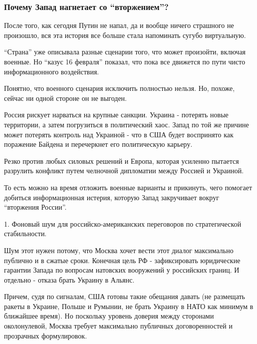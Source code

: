  
 
 
 
 

\subsubsection{Почему Запад нагнетает со \enquote{вторжением}?}

После того, как сегодня Путин не напал, да и вообще ничего страшного не
произошло, вся эта история все больше стала напоминать сугубо виртуальную. 

\enquote{Страна} уже описывала разные сценарии того, что может произойти,
включая военные. Но \enquote{казус 16 февраля} показал, что пока все движется
по пути чисто информационного воздействия. 

Понятно, что военного сценария исключить полностью нельзя. Но, похоже, сейчас
ни одной стороне он не выгоден.

Россия рискует нарваться на крупные санкции. Украина - потерять новые
территории, а затем погрузиться в политический хаос. Запад по той же причине
может потерять контроль над Украиной - что в США будет воспринято как поражение
Байдена и перечеркнет его политическую карьеру. 

Резко против любых силовых решений и Европа, которая усиленно пытается
разрулить конфликт путем челночной дипломатии между Россией и Украиной. 

То есть можно на время отложить военные варианты и прикинуть, чего помогает
добиться информационная истерия, которую Запад закручивает вокруг
\enquote{вторжения России}. 

1. Фоновый шум для российско-американских переговоров по стратегической стабильности.

Шум этот нужен потому, что Москва хочет вести этот диалог максимально публично
и в сжатые сроки. Конечная цель РФ - зафиксировать юридические гарантии Запада
по вопросам натовских вооружений у российских границ. И отдельно - отказа брать
Украину в Альянс. 

Причем, судя по сигналам, США готовы такие обещания давать (не размещать ракеты
в Украине, Польше и Румынии, не брать Украину в НАТО как минимум в ближайшее
время). Но поскольку уровень доверия между сторонами околонулевой, Москва
требует максимально публичных договоренностей и прозрачных формулировок.

